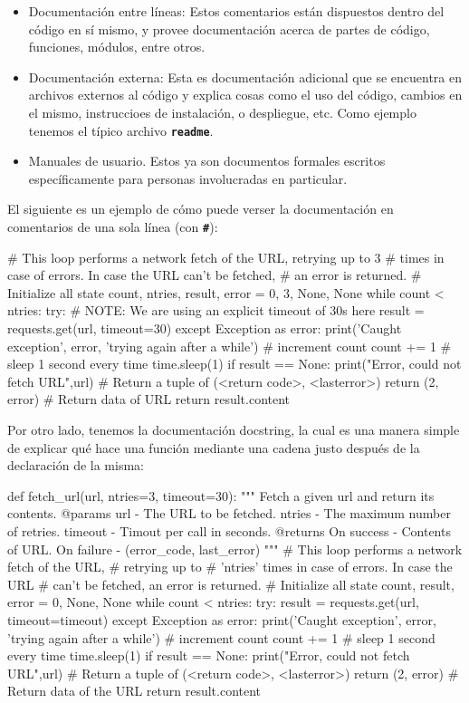 \begin{itemize}
    \item Documentación entre líneas: Estos comentarios están dispuestos dentro del código en sí mismo, y provee documentación acerca de partes de código, funciones, módulos, entre otros.
    \item Documentación externa: Esta es documentación adicional que se encuentra en archivos externos al código y explica cosas como el uso del código, cambios en el mismo, instruccioes de instalación, o despliegue, etc. Como ejemplo tenemos el típico archivo \texttt{\textbf{readme}}.
    \item Manuales de usuario. Estos ya son documentos formales escritos específicamente para personas
    involucradas en particular.
\end{itemize}

El siguiente es un ejemplo de cómo puede verser la documentación en comentarios de una sola línea (con \texttt{\textbf{\#}}):

\begin{VerbatimBold}
# This loop performs a network fetch of the URL, retrying up to 3
# times in case of errors. In case the URL can't be fetched,
# an error is returned.
# Initialize all state
count, ntries, result, error = 0, 3, None, None
while count < ntries:
try:
    # NOTE: We are using an explicit timeout of 30s here
    result = requests.get(url, timeout=30)
except Exception as error:
    print('Caught exception', error, 'trying again after a while')
    # increment count
    count += 1
# sleep 1 second every time
time.sleep(1)
if result == None:
    print("Error, could not fetch URL",url)
    # Return a tuple of (<return code>, <lasterror>)
    return (2, error)
    # Return data of URL
    return result.content
\end{VerbatimBold}


Por otro lado, tenemos la documentación docstring, la cual es una manera simple de explicar qué hace una función mediante una cadena justo después de la declaración de la misma:

\begin{VerbatimBold}
def fetch_url(url, ntries=3, timeout=30):
""" Fetch a given url and return its contents.
@params
    url - The URL to be fetched.
    ntries - The maximum number of retries.
    timeout - Timout per call in seconds.
@returns
    On success - Contents of URL.
    On failure - (error_code, last_error)
"""
# This loop performs a network fetch of the URL,
# retrying up to
# 'ntries' times in case of errors. In case the URL
# can't be fetched, an error is returned.
# Initialize all state
count, result, error = 0, None, None
while count < ntries:
    try:
        result = requests.get(url, timeout=timeout)
    except Exception as error:
        print('Caught exception', error, 'trying again after a while')
        # increment count
        count += 1
        # sleep 1 second every time
        time.sleep(1)
if result == None:
    print("Error, could not fetch URL",url)
    # Return a tuple of (<return code>, <lasterror>)
    return (2, error)
    # Return data of the URL
return result.content
\end{VerbatimBold}

